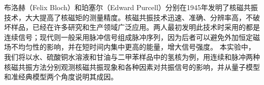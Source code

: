 \par 布洛赫（Felix Bloch）和珀塞尔（Edward Purcell）分别在1945年发明了核磁共振技术，大大提高了核磁矩的测量精度。核磁共振技术迅速、准确、分辨率高，不破坏样品，已经在许多研究和生产领域广泛应用。两人最初发明此技术时采用的都是连续信号；现代则一般采用脉冲信号组成脉冲序列，因为后者可以避免外加恒定磁场不均匀性的影响，并在短时间内集中更高的能量，增大信号强度。
本实验中，我们将以水、硫酸铜水溶液和甘油与二甲苯样品中的氢核为例，用连续和脉冲两种核磁共振方法分别观测核磁共振现象和各种因素对共振信号的影响，并从量子模型和准经典模型两个角度说明其成因。